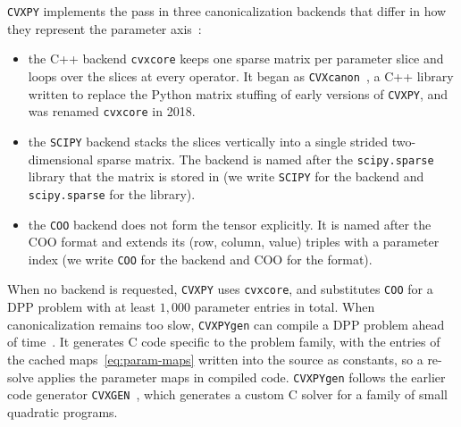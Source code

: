 \texttt{CVXPY} implements the pass in three canonicalization backends that differ in how
they represent the parameter axis~\cite{cvxpydocs}:
\begin{itemize}
\item the C++ backend \texttt{cvxcore} keeps one sparse matrix per parameter slice and
loops over the slices at every operator. It began as \texttt{CVXcanon}~\cite{miller2015cvxcanon},
a C++ library written to replace the Python matrix stuffing of early versions of
\texttt{CVXPY}, and was renamed \texttt{cvxcore} in 2018.
\item the \texttt{SCIPY} backend stacks the slices vertically into a single strided
two-dimensional sparse matrix. The backend is named after the \texttt{scipy.sparse}
library that the matrix is stored in (we write \texttt{SCIPY} for the backend and
\texttt{scipy.sparse} for the library).
\item the \texttt{COO} backend does not form the tensor explicitly. It is named after the
\ac{COO} format and extends its (row, column, value) triples with a parameter index (we write
\texttt{COO} for the backend and \ac{COO} for the format).
\end{itemize}
When no backend is requested, \texttt{CVXPY} uses \texttt{cvxcore}, and substitutes
\texttt{COO} for a DPP problem with at least $1{,}000$ parameter entries in total.
When canonicalization remains too slow, \texttt{CVXPYgen} can compile a DPP problem ahead of
time~\cite{schaller2022cvxpygen}. It generates C code specific to the problem family, with
the entries of the cached maps~\eqref{eq:param-maps} written into the source as constants,
so a re-solve applies the parameter maps in compiled code.
\texttt{CVXPYgen} follows the earlier code generator
\texttt{CVXGEN}~\cite{mattingley2012cvxgen}, which generates a custom C solver for a family
of small quadratic programs.

